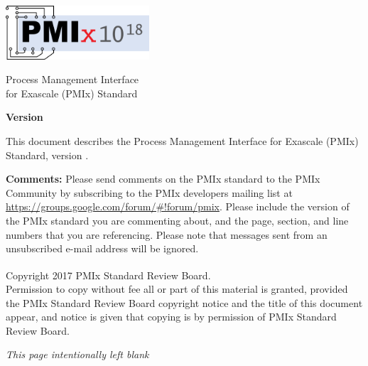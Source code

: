 
  \begin{titlepage}
    \begin{flushleft}
     \hspace{-6em} \includegraphics[width=0.4\textwidth]{figs/pmix-logo.png}
    \end{flushleft}

    \begin{adjustwidth}{-0.75in}{0in}
    \begin{center}
      \Huge
      \textsf{Process Management Interface\\for Exascale (PMIx) Standard}

      \vspace{1.0in}
	  \huge
      \textbf{Version \VER{}}
      
      \vspace{0.15in}
	  \Large
      \textbf{\VERDATE}
      
    \end{center}
    \end{adjustwidth}

    \vspace{1.2in}

\par
This document describes the Process Management Interface for Exascale (PMIx) Standard, version \VER{}.

\par
\textbf{Comments:}
Please send comments on the PMIx standard to the PMIx Community by subscribing to the PMIx developers mailing list at \url{https://groups.google.com/forum/#!forum/pmix}.
Please include the version of the PMIx standard you are commenting about, and the page, section, and line numbers that you are referencing.
Please note that messages sent from an unsubscribed e-mail address will be ignored.

\vfill

\begin{adjustwidth}{0pt}{1em}\setlength{\parskip}{0.25\baselineskip}%
Copyright \textsuperscript{\textcopyright} 2017 PMIx Standard Review Board.\\
Permission to copy without fee all or part of this material is granted,
provided the PMIx Standard Review Board copyright notice and
the title of this document appear, and notice is given that copying is by
permission of PMIx Standard Review Board.
\end{adjustwidth}

  \end{titlepage}

\clearpage
\thispagestyle{empty}
\phantom{a}
\begin{center}
\emph{This page intentionally left blank}
\end{center}

\vfill

